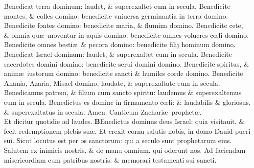 \documentclass[a5paper,10pt]{book}
\def\ae{æ}
\def\oe{œ}
\begin{document}
\begin{multicols*}{2}
\newline \color{red} B\color{black}enedicat terra dominum: laudet, \& superexaltet eum in secula.
\newline \color{red} B\color{black}enedicite montes, \& colles domino: benedicite vniuersa germinantia in terra domino.
\newline \color{red} B\color{black}enedicite fontes domino: benedicite maria, \& flumina domino.
\newline \color{red} B\color{black}enedicite cete, \& omnia qu\ae \ moventur in aquis domino: benedicite omnes volucres c\oe li domino.
\newline \color{red} B\color{black}enedicite omnes besti\ae \ \& pecora domino: benedicite filij hominum domino.
\newline \color{red} B\color{black}enedicat Israel dominum: laudet, \& superexaltet eum in secula.
\newline \color{red} B\color{black}enedicite sacerdotes domini domino: benedicite serui domini domino.
\newline \color{red} B\color{black}enedicite spiritus, \& anim\ae \ iustorum domino: benedicite sancti \& humiles corde domino.
\newline \color{red} B\color{black}enedicite Anania, Azaria, Misael domino, laudate, \& superexaltate eum in secula.
\newline \color{red} B\color{black}enedicamus patrem, \& filium cum sancto spiritu: laudemus \& superexaltemus eum in secula.
\newline \color{red} B\color{black}enedictus es domine in firmamento c\oe li: \& laudabilis \& gloriosus, \& superexaltatus in secula. Amen.
\newline {} \color{red} \hypertarget{Benedictus}{Canticum} Zachari\ae \ prophet\ae .\\Et dicitur quotidie ad laudes. \color{black}
\vspace{-1em}
\lettrine[lines=2]{\bfseries \color{red} B}{}Enedictus dominus deus Israel: quia visitauit, \& fecit redemptionem plebis su\ae .
\newline \color{red} E\color{black}t erexit cornu salutis nobis, in domo Dauid pueri sui.
\newline \color{red} S\color{black}icut locutus est per os sanctorum: qui a seculo sunt prophetarum eius.
\newline \color{red} S\color{black}alutem ex inimicis nostris, \& de manu omnium, qui oderunt nos.
\newline \color{red} A\color{black}d faciendam misericordiam cum patribus nostris: \& memorari testamenti sui sancti.

\end{multicols*}
\end{document}
